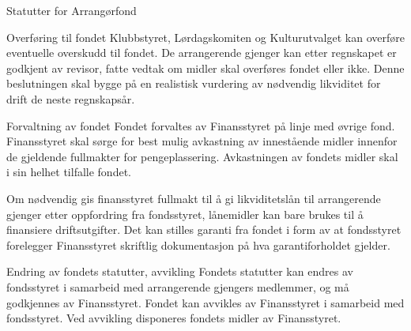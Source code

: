 \begin{fond}{Statutter for Arrangørfond}
  \begin{fondsparagraf}{Overføring til fondet}
Klubbstyret, Lørdagskomiten og Kulturutvalget kan overføre eventuelle overskudd til fondet. De arrangerende gjenger
kan etter regnskapet er godkjent av revisor, fatte vedtak om midler skal overføres fondet eller ikke. Denne
beslutningen skal bygge på en realistisk vurdering av nødvendig likviditet for drift de neste regnskapsår.
  \end{fondsparagraf}
  
  \begin{fondsparagraf}{Forvaltning av fondet}
Fondet forvaltes av Finansstyret på linje med øvrige fond. Finansstyret skal sørge for best mulig avkastning av
innestående midler innenfor de gjeldende fullmakter for pengeplassering. Avkastningen av fondets midler skal i sin
helhet tilfalle fondet.

Om nødvendig gis finansstyret fullmakt til å gi likviditetslån til arrangerende gjenger etter oppfordring fra fondsstyret,
lånemidler kan bare brukes til å finansiere driftsutgifter. Det kan stilles garanti fra fondet i form av at fondsstyret
forelegger Finansstyret skriftlig dokumentasjon på hva garantiforholdet gjelder.
  \end{fondsparagraf}
  
  \begin{fondsparagraf}{Endring av fondets statutter, avvikling}
Fondets statutter kan endres av fondsstyret i samarbeid med arrangerende gjengers medlemmer, og må godkjennes av
Finansstyret. Fondet kan avvikles av Finansstyret i samarbeid med fondsstyret. Ved avvikling disponeres fondets
midler av Finansstyret.
  \end{fondsparagraf}

\end{fond}